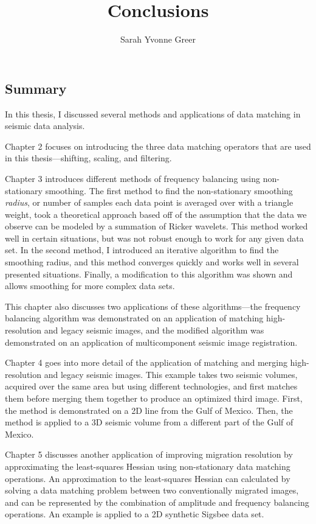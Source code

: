 \title{Conclusions}
\author{Sarah Yvonne Greer}
\maketitle

\subsection{Summary}

In this thesis, I discussed several methods and applications of data matching in seismic data analysis.

Chapter 2 focuses on introducing the three data matching operators that are used in this thesis---shifting, scaling, and filtering.

Chapter 3 introduces different methods of frequency balancing using non-stationary smoothing. 
The first method to find the non-stationary smoothing {\em radius}, or number of samples each data point is averaged over with a triangle weight, took a theoretical approach based off of the assumption that the data we observe can be modeled by a summation of Ricker wavelets.
This method worked well in certain situations, but was not robust enough to work for any given data set.
In the second method, I introduced an iterative algorithm to find the smoothing radius, and this method converges quickly and works well in several presented situations. 
Finally, a modification to this algorithm was shown and allows smoothing for more complex data sets.

This chapter also discusses two applications of these algorithms---the frequency balancing algorithm was demonstrated on an application of matching high-resolution and legacy seismic images, and the modified algorithm was demonstrated on an application of multicomponent seismic image registration.

Chapter 4 goes into more detail of the application of matching and merging high-resolution and legacy seismic images.
This example takes two seismic volumes, acquired over the same area but using different technologies, and first matches them before merging them together to produce an optimized third image.
First, the method is demonstrated on a 2D line from the Gulf of Mexico.
Then, the method is applied to a 3D seismic volume from a different part of the Gulf of Mexico.

Chapter 5 discusses another application of improving migration resolution by approximating the least-squares Hessian using non-stationary data matching operations.
An approximation to the least-squares Hessian can calculated by solving a data matching problem between two conventionally migrated images, and can be represented by the combination of amplitude and frequency balancing operations.
An example is applied to a 2D synthetic Sigsbee data set.

